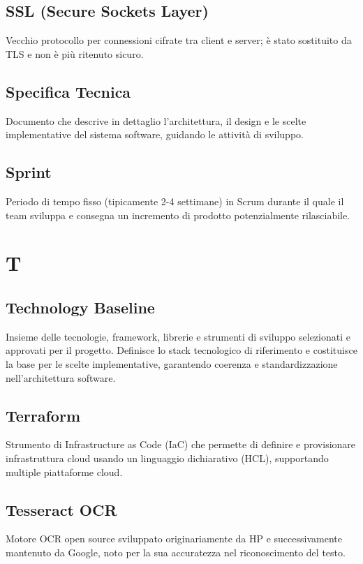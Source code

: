 \documentclass[a4paper,11pt]{article}
\begin{document}
\subsection{SSL (Secure Sockets Layer)}
Vecchio protocollo per connessioni cifrate tra client e server; è stato sostituito da TLS e non è più ritenuto sicuro.

\subsection{Specifica Tecnica}
Documento che descrive in dettaglio l'architettura, il design e le scelte implementative del sistema software, guidando le attività di sviluppo.

\subsection{Sprint}
Periodo di tempo fisso (tipicamente 2-4 settimane) in Scrum durante il quale il team sviluppa e consegna un incremento di prodotto potenzialmente rilasciabile.

\newpage
\section{T}

\subsection{Technology Baseline}
Insieme delle tecnologie, framework, librerie e strumenti di sviluppo selezionati e approvati per il progetto. Definisce lo stack tecnologico di riferimento e costituisce la base per le scelte implementative, garantendo coerenza e standardizzazione nell'architettura software.

\subsection{Terraform}
Strumento di Infrastructure as Code (IaC) che permette di definire e provisionare infrastruttura cloud usando un linguaggio dichiarativo (HCL), supportando multiple piattaforme cloud.

\subsection{Tesseract OCR}
Motore OCR open source sviluppato originariamente da HP e successivamente mantenuto da Google, noto per la sua accuratezza nel riconoscimento del testo.
\end{document}
